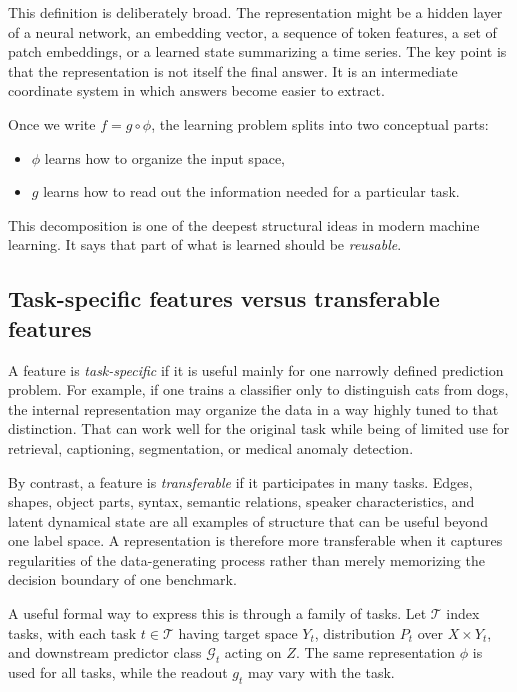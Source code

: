 This definition is deliberately broad.
The representation might be a hidden layer of a neural network, an embedding vector, a sequence of token features, a set of patch embeddings, or a learned state summarizing a time series.
The key point is that the representation is not itself the final answer.
It is an intermediate coordinate system in which answers become easier to extract.

\medskip

Once we write \(f = g \circ \phi\), the learning problem splits into two conceptual parts:
\begin{itemize}
    \item \(\phi\) learns how to organize the input space,
    \item \(g\) learns how to read out the information needed for a particular task.
\end{itemize}
This decomposition is one of the deepest structural ideas in modern machine learning.
It says that part of what is learned should be \emph{reusable}.

\subsection*{Task-specific features versus transferable features}

A feature is \emph{task-specific} if it is useful mainly for one narrowly defined prediction problem.
For example, if one trains a classifier only to distinguish cats from dogs, the internal representation may organize the data in a way highly tuned to that distinction.
That can work well for the original task while being of limited use for retrieval, captioning, segmentation, or medical anomaly detection.

By contrast, a feature is \emph{transferable} if it participates in many tasks.
Edges, shapes, object parts, syntax, semantic relations, speaker characteristics, and latent dynamical state are all examples of structure that can be useful beyond one label space.
A representation is therefore more transferable when it captures regularities of the data-generating process rather than merely memorizing the decision boundary of one benchmark.

A useful formal way to express this is through a family of tasks.
Let \(\mathcal{T}\) index tasks, with each task \(t \in \mathcal{T}\) having target space \(Y_t\), distribution \(P_t\) over \(X \times Y_t\), and downstream predictor class \(\mathcal{G}_t\) acting on \(Z\).
The same representation \(\phi\) is used for all tasks, while the readout \(g_t\) may vary with the task.

